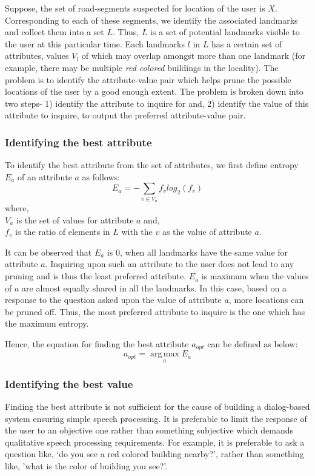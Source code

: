\documentclass{iitkthesis}
\begin{document}
Suppose, the set of road-segments suspected for location of the user is $X$. Corresponding to each of these segments, we identify the associated landmarks and collect them into a set $L$. Thus, $L$ is a set of potential landmarks visible to the user at this particular time. Each landmarks $l$ in $L$ has a certain set of attributes, values $V_{l}$ of which may overlap amongst more than one landmark (for example, there may be multiple \textit{red colored} buildings in the locality). The problem is to identify the attribute-value pair which helps prune the possible locations of the user by a good enough extent. The problem is broken down into two steps- 1) identify the attribute to inquire for and, 2) identify the value of this attribute to inquire, to output the preferred attribute-value pair. 

\subsubsection*{Identifying the best attribute}
 To identify the best attribute from the set of attributes, we first define entropy $E_a$ of an attribute $a$ as follows:
\[\displaystyle E_{a} = - \sum_{v \in V_{a}}f_vlog_{2}{(f_v)}\] 
where, \\
$V_{a}$ is the set of values for attribute $a$ and, \\
$f_{v}$ is the ratio of elements in $L$ with the $v$ as the value of attribute $a$.

It can be observed that $E_a$ is 0, when all landmarks have the same value for attribute $a$. Inquiring upon such an attribute to the user does not lead to any pruning and is thus the least preferred attribute. $E_a$ is maximum when the values of $a$ are almost equally shared in all the landmarks. In this case, based on a response to the question asked upon the value of attribute $a$, more locations can be pruned off. Thus, the most preferred attribute to inquire is the one which has the maximum entropy.

Hence, the equation for finding the best attribute $a_{opt}$ can be defined as below:
\[\displaystyle a_{opt} = \operatorname*{arg\,max}_a E_a\] 

\subsubsection*{Identifying the best value}
Finding the best attribute is not sufficient for the cause of building a dialog-based system ensuring simple speech processing. It is preferable to limit the response of the user to an objective one rather than something subjective which demands qualitative speech processing requirements. For example, it is preferable to ask a question like, `do you see a red colored building nearby?', rather than something like, 'what is the color of building you see?'.
\end{document}
